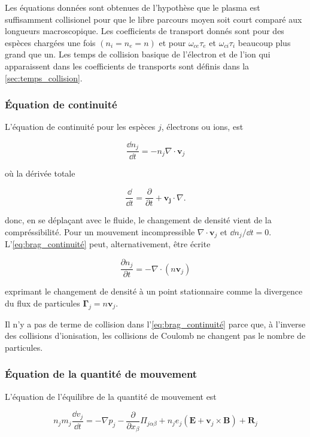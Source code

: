 \documentclass[main.tex]{subfiles}
\begin{document}
Les équations données sont obtenues de l'hypothèse que le plasma est suffisamment collisionel pour que le libre parcours moyen soit court comparé aux longueurs macroscopique.
Les coefficients de transport donnés sont pour des espèces chargées une fois \( \left( n_i = n_e = n\right) \) et pour \( \omega_{ce}\tau_e \) et \( \omega_{ci} \tau_i \) beaucoup plus grand que un.
Les temps de collision basique de l'électron et de l'ion qui apparaissent dans les coefficients de transports sont définis dans la \autoref{sec:temps_collision}.

\subsubsection*{Équation de continuité}

L'équation de continuité pour les espèces \( j \), électrons ou ions, est

\begin{equation}
	\frac{\dd n_j}{\dd t} = - n_j \nabla \cdot \bm{v}_j
	\label{eq:brag_continuité}
\end{equation}

\nit où la dérivée totale

\[
	\frac{\dd}{\dd t} = \frac{\partial}{\partial t} + \bm{v_j} \cdot \nabla.
\]

\nit donc, en se déplaçant avec le fluide, le changement de densité vient de la compréssibilité.
Pour un mouvement incompressible \( \nabla \cdot \bm{v}_j \) et \( \dd n_j / \dd t = 0 \). L'\autoref{eq:brag_continuité} peut, alternativement, être écrite

\[
	\frac{\partial n_j}{\partial t} = - \nabla \cdot \left( n \bm{v}_j \right)
 \]
 
 \nit exprimant le changement de densité à un point stationnaire comme la divergence du flux de particules \( \bm{\Gamma}_j = n \bm{v}_j \).
 
 Il n'y a pas de terme de collision dans l'\autoref{eq:brag_continuité} parce que, à l'inverse des collisions d'ionisation, les collisions de Coulomb ne changent pas le nombre de particules.
 
\subsubsection*{Équation de la quantité de mouvement}
 
L'équation de l'équilibre de la quantité de mouvement est

\begin{equation}
	n_j m_j \frac{\dd v_j}{\dd t} = - \nabla p_j - \frac{\partial}{\partial x_\beta} \Pi_{j\alpha\beta} + n_j e_j \left( \bm{E} + \bm{v}_j \times \bm{B}\right) + \bm{R}_j
	\label{eq:brag_qdm}
\end{equation}
\end{document}
